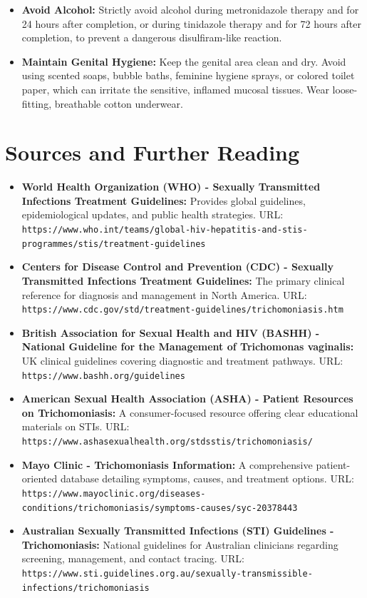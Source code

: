 \begin{itemize}
\begin{itemize}
        \item \textbf{Avoid Alcohol:} Strictly avoid alcohol during metronidazole therapy and for 24 hours after completion, or during tinidazole therapy and for 72 hours after completion, to prevent a dangerous disulfiram-like reaction.
        \item \textbf{Maintain Genital Hygiene:} Keep the genital area clean and dry. Avoid using scented soaps, bubble baths, feminine hygiene sprays, or colored toilet paper, which can irritate the sensitive, inflamed mucosal tissues. Wear loose-fitting, breathable cotton underwear.
    \end{itemize}
\end{itemize}

\section*{Sources and Further Reading}
\begin{itemize}
    \item \textbf{World Health Organization (WHO) - Sexually Transmitted Infections Treatment Guidelines:} Provides global guidelines, epidemiological updates, and public health strategies. URL: \texttt{https://www.who.int/teams/global-hiv-hepatitis-and-stis-programmes/stis/treatment-guidelines}
    \item \textbf{Centers for Disease Control and Prevention (CDC) - Sexually Transmitted Infections Treatment Guidelines:} The primary clinical reference for diagnosis and management in North America. URL: \texttt{https://www.cdc.gov/std/treatment-guidelines/trichomoniasis.htm}
    \item \textbf{British Association for Sexual Health and HIV (BASHH) - National Guideline for the Management of Trichomonas vaginalis:} UK clinical guidelines covering diagnostic and treatment pathways. URL: \texttt{https://www.bashh.org/guidelines}
    \item \textbf{American Sexual Health Association (ASHA) - Patient Resources on Trichomoniasis:} A consumer-focused resource offering clear educational materials on STIs. URL: \texttt{https://www.ashasexualhealth.org/stdsstis/trichomoniasis/}
    \item \textbf{Mayo Clinic - Trichomoniasis Information:} A comprehensive patient-oriented database detailing symptoms, causes, and treatment options. URL: \texttt{https://www.mayoclinic.org/diseases-conditions/trichomoniasis/symptoms-causes/syc-20378443}
    \item \textbf{Australian Sexually Transmitted Infections (STI) Guidelines - Trichomoniasis:} National guidelines for Australian clinicians regarding screening, management, and contact tracing. URL: \texttt{https://www.sti.guidelines.org.au/sexually-transmissible-infections/trichomoniasis}
\end{itemize}